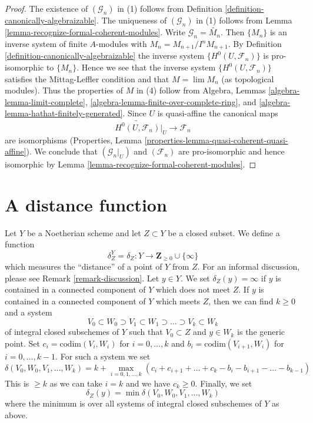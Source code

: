 \documentclass[10pt,a4paper]{amsart}
\theoremstyle{plain}
\theoremstyle{definition}
\theoremstyle{remark}
\numberwithin{equation}{subsection}
\def\lim{\mathop{\mathrm{lim}}\nolimits}
\begin{document}
\begin{proof}
The existence of $(\mathcal{G}_n)$ in (1) follows from
Definition \ref{definition-canonically-algebraizable}.
The uniqueness of $(\mathcal{G}_n)$ in (1) follows from
Lemma \ref{lemma-recognize-formal-coherent-modules}.
Write $\mathcal{G}_n = \widetilde{M_n}$.
Then $\{M_n\}$ is an inverse system of finite $A$-modules
with $M_n = M_{n + 1}/I^n M_{n + 1}$.
By Definition \ref{definition-canonically-algebraizable}
the inverse system $\{H^0(U, \mathcal{F}_n)\}$
is pro-isomorphic to $\{M_n\}$.
Hence we see that the inverse system $\{H^0(U, \mathcal{F}_n)\}$
satisfies the Mittag-Leffler condition and that
$M = \lim M_n$ (as topological modules).
Thus the properties of $M$ in (4) follow from
Algebra, Lemmas \ref{algebra-lemma-limit-complete},
\ref{algebra-lemma-finite-over-complete-ring}, and
\ref{algebra-lemma-hathat-finitely-generated}.
Since $U$ is quasi-affine the canonical maps
$$
\widetilde{H^0(U, \mathcal{F}_n)}|_U \to \mathcal{F}_n
$$
are isomorphisms (Properties, Lemma
\ref{properties-lemma-quasi-coherent-quasi-affine}).
We conclude that $(\mathcal{G}_n|_U)$ and $(\mathcal{F}_n)$ are
pro-isomorphic and hence isomorphic by
Lemma \ref{lemma-recognize-formal-coherent-modules}.
\end{proof}

\section{A distance function}
\label{section-distance}

\noindent
Let $Y$ be a Noetherian scheme and let $Z \subset Y$ be a closed subset.
We define a function
\begin{equation}
\label{equation-delta-Z}
\delta^Y_Z = \delta_Z : Y \longrightarrow \mathbf{Z}_{\geq 0} \cup \{\infty\}
\end{equation}
which measures the ``distance'' of a point of $Y$ from $Z$.
For an informal discussion, please see Remark \ref{remark-discussion}.
Let $y \in Y$. We set $\delta_Z(y) = \infty$ if $y$ is contained
in a connected component of $Y$ which does not meet $Z$.
If $y$ is contained in a connected component of $Y$ which meets $Z$,
then we can find $k \geq 0$ and a system
$$
V_0 \subset W_0 \supset V_1 \subset W_1 \supset \ldots \supset
V_k \subset W_k
$$
of integral closed subschemes of $Y$ such that $V_0 \subset Z$
and $y \in W_k$ is the generic point. Set
$c_i = \text{codim}(V_i, W_i)$ for $i = 0, \ldots, k$
and $b_i = \text{codim}(V_{i + 1}, W_i)$ for $i = 0, \ldots, k - 1$.
For such a system we set
$$
\delta(V_0, W_0, V_1, \ldots, W_k) =
k +
\max_{i = 0, 1, \ldots, k}
(c_i + c_{i + 1} + \ldots + c_k - b_i - b_{i + 1} - \ldots - b_{k - 1})
$$
This is $\geq k$ as we can take $i = k$ and we have $c_k \geq 0$.
Finally, we set
$$
\delta_Z(y) = \min \delta(V_0, W_0, V_1, \ldots, W_k)
$$
where the minimum is over all systems of integral closed subschemes of $Y$
as above.
\end{document}
